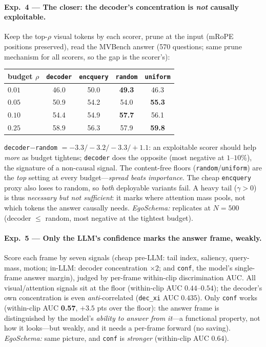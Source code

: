 \documentclass[11pt]{article}
\newcommand{\gm}{\gamma}
\begin{document}
\paragraph{Exp.~4 --- The closer: the decoder's concentration is \emph{not} causally exploitable.}
Keep the top-$\rho$ visual tokens by each scorer, prune at the input (mRoPE positions preserved),
read the MVBench answer (570 questions; same prune mechanism for all scorers, so the gap is the
scorer's):
\begin{center}\small
\begin{tabular}{lcccc}
\toprule
budget $\rho$ & \texttt{decoder} & \texttt{encquery} & \texttt{random} & \texttt{uniform} \\
\midrule
$0.01$ & 46.0 & 50.0 & \textbf{49.3} & 46.3 \\
$0.05$ & 50.9 & 54.2 & 54.0 & \textbf{55.3} \\
$0.10$ & 54.4 & 54.9 & \textbf{57.7} & 56.1 \\
$0.25$ & 58.9 & 56.3 & 57.9 & \textbf{59.8} \\
\bottomrule
\end{tabular}
\end{center}
\texttt{decoder}$-$\texttt{random} $= -3.3/-3.2/-3.3/+1.1$: an exploitable scorer should help
\emph{more} as budget tightens; \texttt{decoder} does the opposite (most negative at $1$--$10\%$),
the signature of a non-causal signal. The content-free floors (\texttt{random}/\texttt{uniform})
are the \emph{top} setting at every budget---\emph{spread beats importance}. The cheap
\texttt{encquery} proxy also loses to random, so \emph{both} deployable variants fail. A heavy tail
($\gm{>}0$) is thus \emph{necessary but not sufficient}: it marks where attention mass pools, not
which tokens the answer causally needs. \emph{EgoSchema:} replicates at $N{=}500$ (decoder $\le$
random, most negative at the tightest budget).

\paragraph{Exp.~5 --- Only the LLM's confidence marks the answer frame, weakly.} Score each frame
by seven signals (cheap pre-LLM: tail index, saliency, query-mass, motion; in-LLM: decoder
concentration $\times2$; and \texttt{conf}, the model's single-frame answer margin), judged by
per-frame within-clip discrimination AUC. All visual/attention signals sit at the floor (within-clip
AUC $0.44$--$0.54$); the decoder's own concentration is even \emph{anti}-correlated
(\texttt{dec\_xi} AUC $0.435$). Only \texttt{conf} works (within-clip AUC \textbf{0.57}, $+3.5$ pts
over the floor): the answer frame is distinguished by the model's \emph{ability to answer from
it}---a functional property, not how it looks---but weakly, and it needs a per-frame forward (no
saving). \emph{EgoSchema:} same picture, and \texttt{conf} is \emph{stronger} (within-clip AUC
$0.64$).
\end{document}
